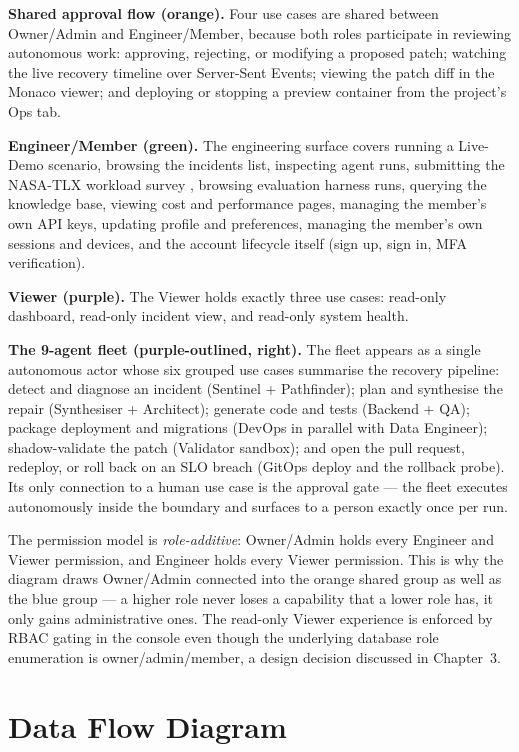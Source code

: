 \textbf{Shared approval flow (orange).} Four use cases are shared between
Owner/Admin and Engineer/Member, because both roles participate in reviewing
autonomous work: approving, rejecting, or modifying a proposed patch;
watching the live recovery timeline over Server-Sent Events; viewing the
patch diff in the Monaco viewer; and deploying or stopping a preview
container from the project's Ops tab.

\textbf{Engineer/Member (green).} The engineering surface covers running a
Live-Demo scenario, browsing the incidents list, inspecting agent runs,
submitting the NASA-TLX workload survey \cite{nasatlx}, browsing evaluation
harness runs, querying the knowledge base, viewing cost and performance
pages, managing the member's own API keys, updating profile and preferences,
managing the member's own sessions and devices, and the account lifecycle
itself (sign up, sign in, MFA verification).

\textbf{Viewer (purple).} The Viewer holds exactly three use cases:
read-only dashboard, read-only incident view, and read-only system health.

\textbf{The 9-agent fleet (purple-outlined, right).} The fleet appears as a
single autonomous actor whose six grouped use cases summarise the recovery
pipeline: detect and diagnose an incident (Sentinel + Pathfinder); plan and
synthesise the repair (Synthesiser + Architect); generate code and tests
(Backend + QA); package deployment and migrations (DevOps in parallel with
Data Engineer); shadow-validate the patch (Validator sandbox); and open the
pull request, redeploy, or roll back on an SLO breach (GitOps deploy and the
rollback probe). Its only connection to a human use case is the approval
gate --- the fleet executes autonomously inside the boundary and surfaces to
a person exactly once per run.

The permission model is \emph{role-additive}: Owner/Admin holds every
Engineer and Viewer permission, and Engineer holds every Viewer permission.
This is why the diagram draws Owner/Admin connected into the orange shared
group as well as the blue group --- a higher role never loses a capability
that a lower role has, it only gains administrative ones. The read-only
Viewer experience is enforced by RBAC gating in the console even though the
underlying database role enumeration is owner/admin/member, a design
decision discussed in Chapter~3.

\section{Data Flow Diagram}

